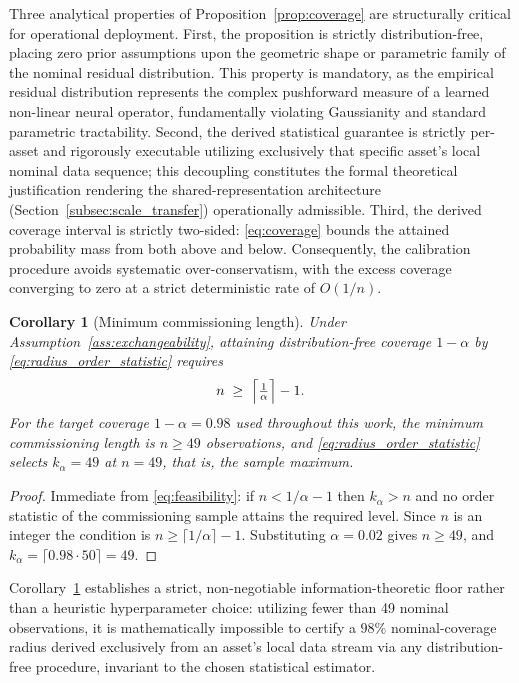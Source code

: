 \documentclass[a4paper]{cas-sc}
\newtheorem{corollary}{Corollary}
\begin{document}
Three analytical properties of Proposition~\ref{prop:coverage} are structurally critical for operational deployment. First, the proposition is strictly distribution-free, placing zero prior assumptions upon the geometric shape or parametric family of the nominal residual distribution. This property is mandatory, as the empirical residual distribution represents the complex pushforward measure of a learned non-linear neural operator, fundamentally violating Gaussianity and standard parametric tractability. Second, the derived statistical guarantee is strictly per-asset and rigorously executable utilizing exclusively that specific asset's local nominal data sequence; this decoupling constitutes the formal theoretical justification rendering the shared-representation architecture (Section~\ref{subsec:scale_transfer}) operationally admissible. Third, the derived coverage interval is strictly two-sided: \eqref{eq:coverage} bounds the attained probability mass from both above and below. Consequently, the calibration procedure avoids systematic over-conservatism, with the excess coverage converging to zero at a strict deterministic rate of \(O(1/n)\).

\begin{corollary}[Minimum commissioning length]
\label{cor:min_commissioning}
Under Assumption~\ref{ass:exchangeability}, attaining distribution-free
coverage \(1-\alpha\) by \eqref{eq:radius_order_statistic} requires
\begin{equation}
n \;\ge\; \Bigl\lceil \tfrac{1}{\alpha} \Bigr\rceil - 1 .
\label{eq:min_n}
\end{equation}
For the target coverage \(1-\alpha=0.98\) used throughout this work, the
minimum commissioning length is \(n\ge 49\) observations, and
\eqref{eq:radius_order_statistic} selects \(k_\alpha=49\) at \(n=49\), that
is, the sample maximum.
\end{corollary}

\begin{proof}
Immediate from \eqref{eq:feasibility}: if \(n<1/\alpha-1\) then
\(k_\alpha>n\) and no order statistic of the commissioning sample attains
the required level. Since \(n\) is an integer the condition is
\(n\ge\lceil 1/\alpha\rceil-1\). Substituting \(\alpha=0.02\) gives
\(n\ge 49\), and \(k_\alpha=\lceil 0.98\cdot 50\rceil = 49\).
\end{proof}

Corollary~\ref{cor:min_commissioning} establishes a strict, non-negotiable information-theoretic floor rather than a heuristic hyperparameter choice: utilizing fewer than 49 nominal observations, it is mathematically impossible to certify a \(98\%\) nominal-coverage radius derived exclusively from an asset's local data stream via any distribution-free procedure, invariant to the chosen statistical estimator.
\end{document}
